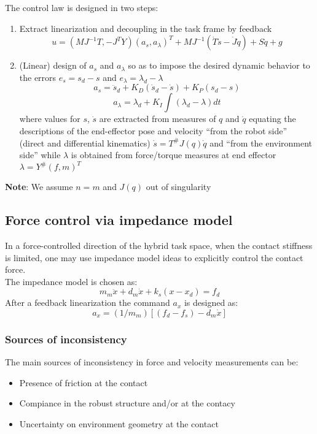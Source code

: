 \documentclass[a4paper,12pt]{article}
\begin{document}
The control law is designed in two steps:
\begin{enumerate}
    \item Extract linearization and decoupling in the task frame by feedback
            \begin{equation}
            u=(MJ^{-1}T, -J^TY)(a_s, a_{\lambda})^T + MJ^{-1}(\dot{T}\dot{s}-\dot{J}\dot{q}) + S\dot{q} +g
            \end{equation}
    \item (Linear) design of $a_s$ and $a_{\lambda}$ so as to impose 
the desired dynamic
behavior to the errors $e_s = s_d - s$ and $e_{\lambda} = \lambda_d - \lambda$
\begin{equation}
a_s=\ddot{s}_d+ K_D(\dot{s}_d-\dot{s})+K_P(s_d-s)
\end{equation}
\begin{equation}
a_{\lambda}=\lambda_d + K_I \int(\lambda_d-\lambda)dt
\end{equation}
where values for $s$, $\dot{s}$ are extracted from measures 
of $q$ and $\dot{q}$ equating the descriptions
of the end-effector pose and velocity “from the robot side”
 (direct and
differential kinematics) $\dot{s}=T^{\#}J(q)\dot{q}$ and “from the environment side” while 
$\lambda$ is obtained from 
force/torque measures at end effector $\lambda=Y^{\#}(f,m)^T$
\end{enumerate}
\textbf{Note}: We assume $n=m$ and $J(q)$ out of singularity
\subsection{Force control via impedance model}
In a force-controlled direction of the hybrid task space, when the contact
stiffness is limited,
one may use impedance model ideas to 
explicitly control the contact force.\\
The impedance model is chosen as:\begin{equation}
m_m\ddot{x}+d_m\dot{x}+k_s(x-x_d)=f_d
\end{equation}
After a feedback linearization the command $a_x$ is designed as:
\begin{equation}
a_x =(1/m_m)[(f_d-f_s)-d_m\dot{x}]
\end{equation}
\subsubsection{Sources of inconsistency}
The main sources of inconsistency in force and velocity measurements can be:
\begin{itemize}
    \item Presence of friction at the contact 
    \item Compiance in the robust structure and/or at the contacy
    \item Uncertainty on environment geometry at the contact
\end{itemize}
\end{document}
